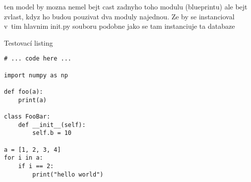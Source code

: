 ten model by mozna nemel bejt cast zadnyho toho modulu (blueprintu) ale bejt zvlast, kdyz ho budou pouzivat dva moduly najednou. Ze by se instancioval v~tim hlavnim init.py souboru podobne jako se tam instanciuje ta databaze


\begin{listing}[htbp]
\caption{\label{code:foo} Testovací listing}
\begin{verbatim}
# ... code here ...

import numpy as np

def foo(a):
    print(a)

class FooBar:
    def __init__(self):
        self.b = 10

a = [1, 2, 3, 4]
for i in a:
    if i == 2:
        print("hello world")
\end{verbatim}
\end{listing}